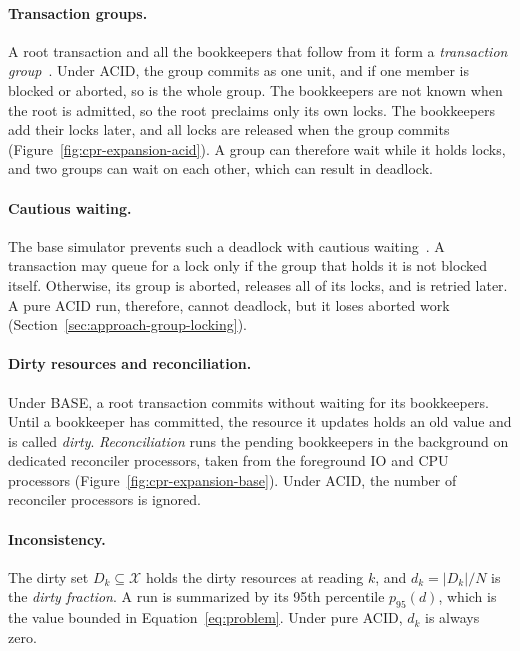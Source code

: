 \paragraph{Transaction groups.}\label{sec:prelim-group}
A root transaction and all the bookkeepers that follow from it form a
\emph{transaction group}~\cite{zacouris2026mxs}. Under ACID, the group commits as
one unit, and if one member is blocked or aborted, so is the whole group. The
bookkeepers are not known when the root is admitted, so the root preclaims only
its own locks. The bookkeepers add their locks later, and all locks are released
when the group commits (Figure~\ref{fig:cpr-expansion-acid}). A group can
therefore wait while it holds locks, and two groups can wait on each other,
which can result in deadlock.

\paragraph{Cautious waiting.}\label{sec:prelim-deadlock}
The base simulator prevents such a deadlock with cautious
waiting~\cite{hsu1992cautious,zacouris2026mxs}. A transaction may queue for a
lock only if the group that holds it is not blocked itself. Otherwise, its group
is aborted, releases all of its locks, and is retried later. A pure ACID run,
therefore, cannot deadlock, but it loses aborted work
(Section~\ref{sec:approach-group-locking}).

\paragraph{Dirty resources and reconciliation.}\label{sec:prelim-reconciliation}
Under BASE, a root transaction commits without waiting for its bookkeepers. Until
a bookkeeper has committed, the resource it updates holds an old value and is
called \emph{dirty}. \emph{Reconciliation} runs the pending bookkeepers in the
background on dedicated reconciler processors, taken from the foreground IO and CPU processors
(Figure~\ref{fig:cpr-expansion-base}). Under ACID, the number of reconciler processors is ignored.

\paragraph{Inconsistency.}\label{sec:prelim-inconsistency}
The dirty set $D_k \subseteq \mathcal{X}$ holds the dirty resources at reading
$k$, and $d_k = |D_k| / N$ is the \emph{dirty fraction}. A run is summarized by
its 95th percentile $p_{95}(d)$, which is the value bounded in
Equation~\ref{eq:problem}. Under pure ACID, $d_k$ is always zero.


